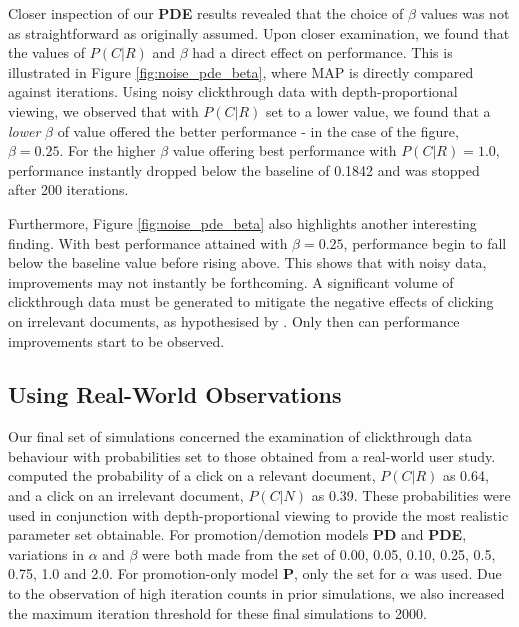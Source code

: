 Closer inspection of our \textbf{PDE} results revealed that the choice of $\beta$ values was not as straightforward as originally assumed. Upon closer examination, we found that the values of $P(C|R)$ and $\beta$ had a direct effect on performance. This is illustrated in Figure \ref{fig:noise_pde_beta}, where MAP is directly compared against iterations. Using noisy clickthrough data with depth-proportional viewing, we observed that with $P(C|R)$ set to a lower value, we found that a \emph{lower} $\beta$ of value offered the better performance - in the case of the figure, $\beta = 0.25$. For the higher $\beta$ value offering best performance with $P(C|R) = 1.0$, performance instantly dropped below the baseline of 0.1842 and was stopped after 200 iterations.

Furthermore, Figure \ref{fig:noise_pde_beta} also highlights another interesting finding. With best performance attained with $\beta = 0.25$, performance begin to fall below the baseline value before rising above. This shows that with noisy data, improvements may not instantly be forthcoming. A significant volume of clickthrough data must be generated to mitigate the negative effects of clicking on irrelevant documents, as hypothesised by \citeauthor{joachims2002optimizing_clickthrough} \cite{joachims2002optimizing_clickthrough}. Only then can performance improvements start to be observed.

\subsection{Using Real-World Observations}
Our final set of simulations concerned the examination of clickthrough data behaviour with probabilities set to those obtained from a real-world user study. \citeauthor{smucker2012time_based_calibration} \cite{smucker2012time_based_calibration} computed the probability of a click on a relevant document, $P(C|R)$ as 0.64, and a click on an irrelevant document, $P(C|N)$ as 0.39. These probabilities were used in conjunction with depth-proportional viewing to provide the most realistic parameter set obtainable. For promotion/demotion models \textbf{PD} and \textbf{PDE}, variations in $\alpha$ and $\beta$ were both made from the set of 0.00, 0.05, 0.10, 0.25, 0.5, 0.75, 1.0 and 2.0. For promotion-only model \textbf{P}, only the set for $\alpha$ was used. Due to the observation of high iteration counts in prior simulations, we also increased the maximum iteration threshold for these final simulations to 2000.

